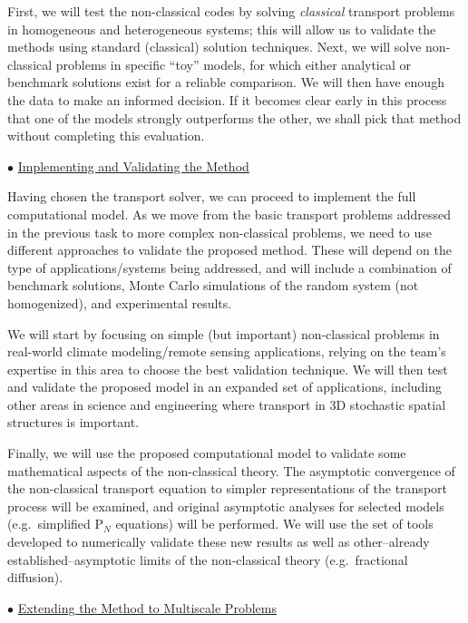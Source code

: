 \documentclass[12pt]{article}
\begin{document}
First, we will test the non-classical codes by solving \textit{classical} transport problems in homogeneous and heterogeneous systems; this will allow us to validate the methods using standard (classical) solution techniques.
Next, we will solve non-classical problems in specific ``toy'' models, for which either analytical or benchmark solutions exist for a reliable comparison.
We will then have enough the data to make an informed decision.
If it becomes clear early in this process that one of the models strongly outperforms the other, we shall pick that method without completing this evaluation.

$\bullet$ \underline{Implementing and Validating the Method}

Having chosen the transport solver, we can proceed to implement the full computational model.
As we move from the basic transport problems addressed in the previous task to more complex non-classical problems, we need to use different approaches to validate the proposed method.
These will depend on the type of applications/systems being addressed, and will include a combination of benchmark solutions, Monte Carlo simulations of the random system (not homogenized), and experimental results.

We will start by focusing on simple (but important) non-classical problems in real-world climate modeling/remote sensing applications, relying on the team's expertise in this area to choose the best validation technique.
We will then test and validate the proposed model in an expanded set of applications, including other areas in science and engineering where transport in 3D stochastic spatial structures is important.

Finally, we will use the proposed computational model to validate some mathematical aspects of the non-classical theory.
The asymptotic convergence of the non-classical transport equation to simpler representations of the transport process will be examined, and original asymptotic analyses for selected models (e.g.\ simplified P$_N$ equations) will be performed.
We will use the set of tools developed to numerically validate these new results as well as other--already established--asymptotic limits of the non-classical theory (e.g.\ fractional diffusion).

$\bullet$ \underline{Extending the Method to Multiscale Problems}
\end{document}

